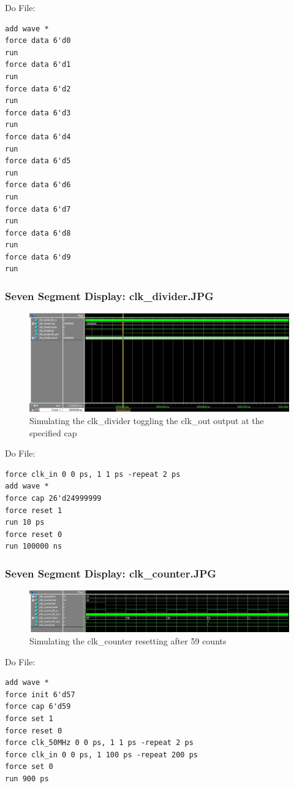 \documentclass[a4paper]{article}
\begin{document}
Do File:
\begin{Verbatim}
add wave *
force data 6'd0
run
force data 6'd1
run
force data 6'd2
run
force data 6'd3
run
force data 6'd4
run
force data 6'd5
run
force data 6'd6
run
force data 6'd7
run
force data 6'd8
run
force data 6'd9
run

\end{Verbatim}

\subsubsection{Seven Segment Display: clk_divider.JPG}
\begin{figure}[H]
    \includegraphics[width=0.8 \linewidth]{images/clk_divider_sim}
    \caption{Simulating the clk_divider toggling the clk_out output at the specified cap}
    \label{clk_divider_sim}
\end{figure}

Do File:
\begin{Verbatim}
force clk_in 0 0 ps, 1 1 ps -repeat 2 ps
add wave *
force cap 26'd24999999
force reset 1
run 10 ps
force reset 0
run 100000 ns

\end{Verbatim}

\subsubsection{Seven Segment Display: clk_counter.JPG}
\begin{figure}[H]
    \includegraphics[width=0.8 \linewidth]{images/clk_counter_sim}
    \caption{Simulating the clk_counter resetting after 59 counts}
    \label{clk_counter_sim}
\end{figure}

Do File:
\begin{Verbatim}
add wave *
force init 6'd57
force cap 6'd59
force set 1
force reset 0
force clk_50MHz 0 0 ps, 1 1 ps -repeat 2 ps
force clk_in 0 0 ps, 1 100 ps -repeat 200 ps
force set 0
run 900 ps

\end{Verbatim}
\end{document}
